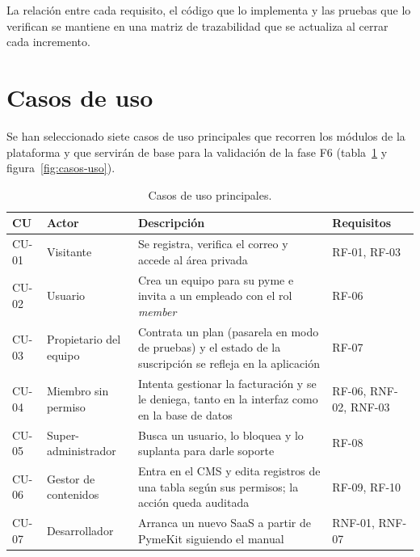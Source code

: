 La relación entre cada requisito, el código que lo implementa y las pruebas
que lo verifican se mantiene en una matriz de trazabilidad que se actualiza al
cerrar cada incremento.

\section{Casos de uso}
\label{sec:casos-uso}

Se han seleccionado siete casos de uso principales que recorren los módulos
de la plataforma y que servirán de base para la validación de la fase F6
(tabla~\ref{tab:cu} y figura~\ref{fig:casos-uso}).

\begin{table}[htbp]
  \centering
  \footnotesize
  \caption{Casos de uso principales.}
  \label{tab:cu}
  \begin{tabularx}{\textwidth}{@{}l>{\raggedright\arraybackslash}p{2.6cm}Xl@{}}
    \toprule
    \textbf{CU} & \textbf{Actor} & \textbf{Descripción} & \textbf{Requisitos} \\
    \midrule
    CU-01 & Visitante & Se registra, verifica el correo y accede al área privada & RF-01, RF-03 \\
    CU-02 & Usuario & Crea un equipo para su pyme e invita a un empleado con el rol \textit{member} & RF-06 \\
    CU-03 & Propietario del equipo & Contrata un plan (pasarela en modo de pruebas) y el estado de la suscripción se refleja en la aplicación & RF-07 \\
    CU-04 & Miembro sin permiso & Intenta gestionar la facturación y se le deniega, tanto en la interfaz como en la base de datos & RF-06, RNF-02, RNF-03 \\
    CU-05 & Super-administrador & Busca un usuario, lo bloquea y lo suplanta para darle soporte & RF-08 \\
    CU-06 & Gestor de contenidos & Entra en el CMS y edita registros de una tabla según sus permisos; la acción queda auditada & RF-09, RF-10 \\
    CU-07 & Desarrollador & Arranca un nuevo SaaS a partir de PymeKit siguiendo el manual & RNF-01, RNF-07 \\
    \bottomrule
  \end{tabularx}
\end{table}

